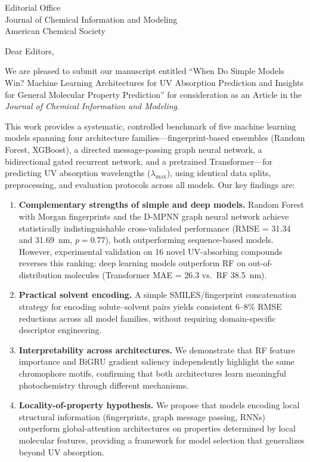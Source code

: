 \documentclass[11pt]{letter}
\begin{document}
\begin{letter}{Editorial Office\\
Journal of Chemical Information and Modeling\\
American Chemical Society}

\opening{Dear Editors,}

We are pleased to submit our manuscript entitled ``When Do Simple Models Win? Machine Learning Architectures for UV Absorption Prediction and Insights for General Molecular Property Prediction'' for consideration as an Article in the \textit{Journal of Chemical Information and Modeling}.

This work provides a systematic, controlled benchmark of five machine learning models spanning four architecture families---fingerprint-based ensembles (Random Forest, XGBoost), a directed message-passing graph neural network, a bidirectional gated recurrent network, and a pretrained Transformer---for predicting UV absorption wavelengths ($\lambda_{\max}$), using identical data splits, preprocessing, and evaluation protocols across all models.
Our key findings are:

\begin{enumerate}
    \item \textbf{Complementary strengths of simple and deep models.} Random Forest with Morgan fingerprints and the D-MPNN graph neural network achieve statistically indistinguishable cross-validated performance (RMSE = 31.34 and 31.69~nm, $p = 0.77$), both outperforming sequence-based models. However, experimental validation on 16 novel UV-absorbing compounds reverses this ranking: deep learning models outperform RF on out-of-distribution molecules (Transformer MAE = 26.3 vs.\ RF 38.5~nm).

    \item \textbf{Practical solvent encoding.} A simple SMILES/fingerprint concatenation strategy for encoding solute--solvent pairs yields consistent 6--8\% RMSE reductions across all model families, without requiring domain-specific descriptor engineering.

    \item \textbf{Interpretability across architectures.} We demonstrate that RF feature importance and BiGRU gradient saliency independently highlight the same chromophore motifs, confirming that both architectures learn meaningful photochemistry through different mechanisms.

    \item \textbf{Locality-of-property hypothesis.} We propose that models encoding local structural information (fingerprints, graph message passing, RNNs) outperform global-attention architectures on properties determined by local molecular features, providing a framework for model selection that generalizes beyond UV absorption.
\end{enumerate}


\end{letter}
\end{document}
